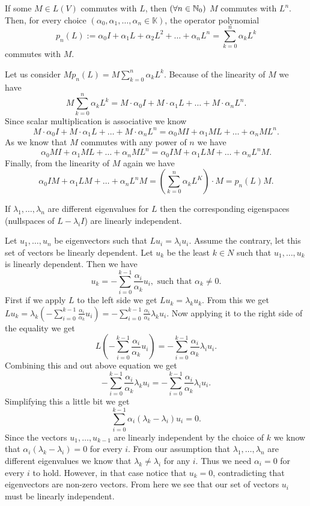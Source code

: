 \documentclass{article}
\begin{document}
\begin{problem}
  If some $M \in L(V)$ commutes with $L$, then $(\forall n \in \mathbb{N}_0)$ $M$ commutes with $L^n$.
  Then, for every choice $(\alpha_0, \alpha_1, \ldots, \alpha_n \in \mathbb{K})$, the operator polynomial
  \[p_n(L) := \alpha_0 I + \alpha_1 L + \alpha_2 L^2 + \ldots + \alpha_n L^n = \sum_{k = 0}^{n} \alpha_k L^k\]
  commutes with $M$.
\end{problem}

\begin{solution}
  Let us consider $M p_n(L) = M \sum_{k = 0}^{n} \alpha_k L^k$.
  Because of the linearity of $M$ we have
  \[M \sum_{k = 0}^{n} \alpha_k L^k = M \cdot \alpha_0 I + M \cdot \alpha_1 L + \ldots + M \cdot \alpha_n L^n.\]
  Since scalar multiplication is associative we know
  \[M \cdot \alpha_0 I + M \cdot \alpha_1 L + \ldots + M \cdot \alpha_n L^n = \alpha_0 M I + \alpha_1 M L + \ldots + \alpha_n M L^n.\]
  As we know that $M$ commutes with any power of $n$ we have
  \[\alpha_0 M I + \alpha_1 M L + \ldots + \alpha_n M L^n = \alpha_0 I M + \alpha_1 L M + \ldots + \alpha_n L^n M.\]
  Finally, from the linearity of $M$ again we have
  \[\alpha_0 I M + \alpha_1 L M + \ldots + \alpha_n L^n M = (\sum_{k = 0}^{n} \alpha_k L^K) \cdot M = p_n(L) M.\]
\end{solution}

\begin{problem}
  If $\lambda_1, \ldots, \lambda_n$ are different eigenvalues for $L$ then the corresponding eigenspaces (nullspaces of $L - \lambda_i I$) are linearly independent.
\end{problem}

\begin{solution}
  Let $u_1, \ldots, u_n$ be eigenvectors such that $Lu_i = \lambda_i u_i$.
  Assume the contrary, let this set of vectors be linearly dependent.
  Let $u_k$ be the least $k \in N$ such that $u_1, \ldots, u_k$ is linearly dependent.
  Then we have
  \[u_k = - \sum_{i = 0}^{k - 1} \frac{\alpha_i}{\alpha_k} u_i, \text{ such that $\alpha_k \neq 0$.}\]
  First if we apply $L$ to the left side we get $Lu_k = \lambda_k u_k$.
  From this we get $Lu_k = \lambda_k (- \sum_{i = 0}^{k - 1} \frac{\alpha_i}{\alpha_k} u_i) = - \sum_{i = 0}^{k - 1} \frac{\alpha_i}{\alpha_k} \lambda_k u_i$.
  Now applying it to the right side of the equality we get
  \[L(- \sum_{i = 0}^{k - 1} \frac{\alpha_i}{\alpha_k} u_i) = - \sum_{i = 0}^{k - 1} \frac{\alpha_i}{\alpha_k} \lambda_i u_i.\]
  Combining this and out above equation we get
  \[- \sum_{i = 0}^{k - 1} \frac{\alpha_i}{\alpha_k} \lambda_k u_i = - \sum_{i = 0}^{k - 1} \frac{\alpha_i}{\alpha_k} \lambda_i u_i.\]
  Simplifying this a little bit we get
  \[\sum_{i = 0}^{k - 1} \alpha_i (\lambda_k - \lambda_i) u_i = 0.\]
  Since the vectors $u_1, \ldots, u_{k - 1}$ are linearly independent by the choice of $k$ we know that $\alpha_i (\lambda_k - \lambda_i) = 0$ for every $i$.
  From our assumption that $\lambda_1, \ldots, \lambda_n$ are different eigenvalues we know that $\lambda_k \neq \lambda_i$ for any $i$.
  Thus we need $\alpha_i = 0$ for every $i$ to hold.
  However, in that case notice that $u_k = 0$, contradicting that eigenvectors are non-zero vectors.
  From here we see that our set of vectors $u_i$ must be linearly independent.
\end{solution}
\end{document}
